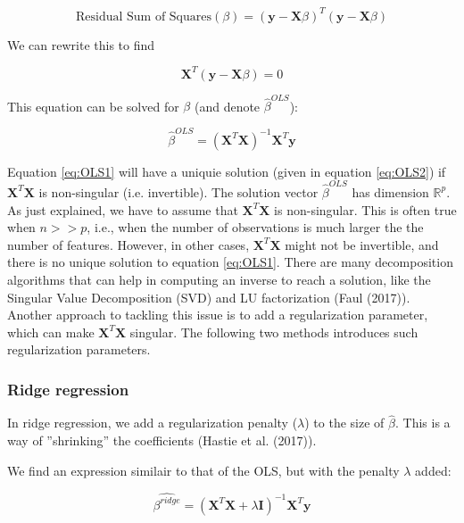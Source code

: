 \documentclass[a4paper]{article}
\newcommand{\R}{\mathbb{R}}
\begin{document}
\begin{equation*}
\text{Residual Sum of Squares} (\beta) = (\textbf{y} - \textbf{X} \beta)^{T}(\textbf{y} - \textbf{X}\beta)
\end{equation*}

We can rewrite this to find

\begin{equation}
\textbf{X}^{T}(\textbf{y} - \textbf{X}\beta) = 0 \label{eq:OLS1}
\end{equation}

This equation can be solved for $\beta$ (and denote $\hat{\beta}^{OLS}$):

\begin{equation}
\hat{\beta}^{OLS} = (\textbf{X}^{T}\textbf{X})^{-1}\textbf{X}^{T}\textbf{y} \label{eq:OLS2}
\end{equation}

Equation \ref{eq:OLS1} will have a uniquie solution (given in equation \ref{eq:OLS2})  if $\textbf{X}^{T}\textbf{X}$ is non-singular (i.e. invertible). The solution vector $\hat{\beta}^{OLS}$ has dimension $\R^{p}$. \\

As just explained, we have to assume that $\textbf{X}^{T}\textbf{X}$ is non-singular. This is often true when $n >> p$, i.e., when the number of observations is much larger the the number of features. However, in other cases, $\textbf{X}^{T}\textbf{X}$ might not be invertible, and there is no unique solution to equation \ref{eq:OLS1}. 
There are many decomposition algorithms that can help in computing an inverse to reach a solution, like the Singular Value Decomposition (SVD) and LU factorization (Faul (2017)). Another approach to tackling this issue is to add a regularization parameter, which can make $\textbf{X}^{T}\textbf{X}$ singular. The following two methods introduces such regularization parameters.

\subsubsection{Ridge regression}

In ridge regression, we add a regularization penalty ($\lambda$) to the size of $\hat{\beta}$. This is a way of  ''shrinking'' the coefficients (Hastie et al. (2017)).

We find an expression similair to that of the OLS, but with the penalty $\lambda$ added:

\begin{equation*}
\hat{\beta^{ridge}} = ( \textbf{X}^{T}\textbf{X} + \lambda\textbf{I})^{-1} \textbf{X}^{T}\textbf{y} \label{eq:Ridge}
\end{equation*}
\end{document}
